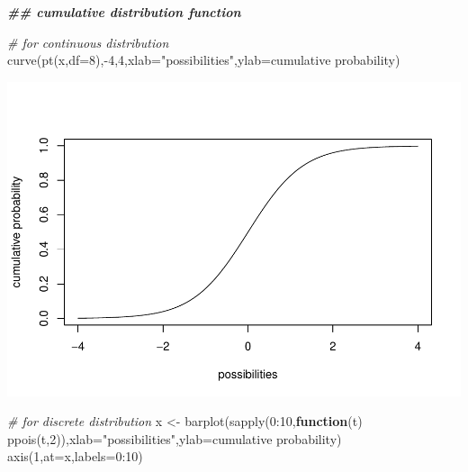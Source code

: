 \documentclass[
]{article}
\newenvironment{Shaded}{\begin{snugshade}}{\end{snugshade}}
\newcommand{\AttributeTok}[1]{\textcolor[rgb]{0.77,0.63,0.00}{#1}}
\newcommand{\CommentTok}[1]{\textcolor[rgb]{0.56,0.35,0.01}{\textit{#1}}}
\newcommand{\ControlFlowTok}[1]{\textcolor[rgb]{0.13,0.29,0.53}{\textbf{#1}}}
\newcommand{\DecValTok}[1]{\textcolor[rgb]{0.00,0.00,0.81}{#1}}
\newcommand{\DocumentationTok}[1]{\textcolor[rgb]{0.56,0.35,0.01}{\textbf{\textit{#1}}}}
\newcommand{\FunctionTok}[1]{\textcolor[rgb]{0.00,0.00,0.00}{#1}}
\newcommand{\NormalTok}[1]{#1}
\newcommand{\OtherTok}[1]{\textcolor[rgb]{0.56,0.35,0.01}{#1}}
\newcommand{\SpecialCharTok}[1]{\textcolor[rgb]{0.00,0.00,0.00}{#1}}
\newcommand{\StringTok}[1]{\textcolor[rgb]{0.31,0.60,0.02}{#1}}
\begin{document}
\begin{Shaded}
\begin{Highlighting}[]
\DocumentationTok{\#\# cumulative distribution function  }

    \CommentTok{\# for continuous distribution}
\FunctionTok{curve}\NormalTok{(}\FunctionTok{pt}\NormalTok{(x,}\AttributeTok{df=}\DecValTok{8}\NormalTok{),}\SpecialCharTok{{-}}\DecValTok{4}\NormalTok{,}\DecValTok{4}\NormalTok{,}\AttributeTok{xlab=}\StringTok{"possibilities"}\NormalTok{,}\AttributeTok{ylab=}\StringTok{\textquotesingle{}cumulative probability\textquotesingle{}}\NormalTok{)}
\end{Highlighting}
\end{Shaded}

\includegraphics{LECTURE2_files/figure-latex/unnamed-chunk-18-1.pdf}

\begin{Shaded}
\begin{Highlighting}[]
    \CommentTok{\# for discrete distribution}
\NormalTok{x }\OtherTok{\textless{}{-}} \FunctionTok{barplot}\NormalTok{(}\FunctionTok{sapply}\NormalTok{(}\DecValTok{0}\SpecialCharTok{:}\DecValTok{10}\NormalTok{,}\ControlFlowTok{function}\NormalTok{(t) }\FunctionTok{ppois}\NormalTok{(t,}\DecValTok{2}\NormalTok{)),}\AttributeTok{xlab=}\StringTok{"possibilities"}\NormalTok{,}\AttributeTok{ylab=}\StringTok{\textquotesingle{}cumulative probability\textquotesingle{}}\NormalTok{)}
\FunctionTok{axis}\NormalTok{(}\DecValTok{1}\NormalTok{,}\AttributeTok{at=}\NormalTok{x,}\AttributeTok{labels=}\DecValTok{0}\SpecialCharTok{:}\DecValTok{10}\NormalTok{)}
\end{Highlighting}
\end{Shaded}
\end{document}
